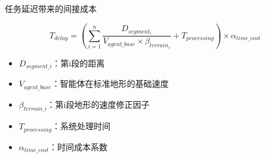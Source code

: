 \documentclass[
10pt,
aspectratio=169,
]{beamer}
\begin{document}
\begin{frame}
  \begin{alertblock}{任务延迟带来的间接成本}
 \end{alertblock}
 \begin{exampleblock}{}
\begin{equation}
    T_{delay} = \left(\sum_{i=1}^{n} \frac{D_{segment_i}}{V_{agent\_base} \times \beta_{terrain_i}} + T_{processing}\right) \times \alpha_{time\_cost}
\end{equation}
  \end{exampleblock}

 \begin{exampleblock}{}

                \begin{itemize}
				
                    \item $D_{segment\_i}$：第i段的距离
 \item $V_{agent\_base}$：智能体在标准地形的基础速度
 \item $\beta_{terrain\_i}$：第i段地形的速度修正因子
 \item $T_{processing}$：系统处理时间
 \item $\alpha_{time\_cost}$：时间成本系数
	
		
                    
                \end{itemize}
            \end{exampleblock}

\end{frame}	
\end{document}
